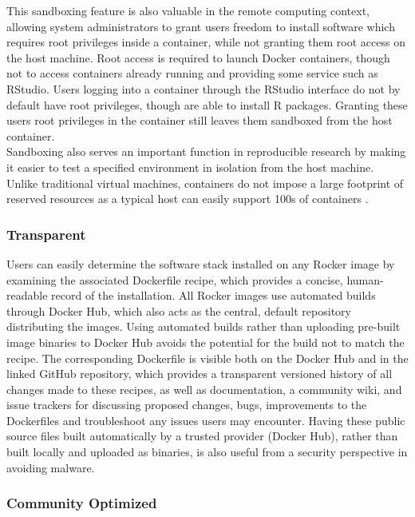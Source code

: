 This sandboxing feature is also valuable in the remote computing
context, allowing system administrators to grant users freedom to
install software which requires root privileges inside a container,
while not granting them root access on the host machine. Root access is
required to launch Docker containers, though not to access containers
already running and providing some service such as RStudio. Users
logging into a container through the
RStudio\textsuperscript{\textregistered} interface do not by default
have root privileges, though are able to install R packages. Granting
these users root privileges in the container still leaves them sandboxed
from the host container.\\
Sandboxing also serves an important function in reproducible research by
making it easier to test a specified environment in isolation from the
host machine. Unlike traditional virtual machines, containers do not
impose a large footprint of reserved resources as a typical host can
easily support 100s of containers \citep{what-docker}.

\subsubsection{Transparent}\label{transparent}

Users can easily determine the software stack installed on any Rocker
image by examining the associated Dockerfile recipe, which provides a
concise, human-readable record of the installation. All Rocker images
use automated builds through Docker Hub, which also acts as the central,
default repository distributing the images. Using automated builds
rather than uploading pre-built image binaries to Docker Hub avoids the
potential for the build not to match the recipe. The corresponding
Dockerfile is visible both on the Docker Hub and in the linked GitHub
repository, which provides a transparent versioned history of all
changes made to these recipes, as well as documentation, a community
wiki, and issue trackers for discussing proposed changes, bugs,
improvements to the Dockerfiles and troubleshoot any issues users may
encounter. Having these public source files built automatically by a
trusted provider (Docker Hub), rather than built locally and uploaded as
binaries, is also useful from a security perspective in avoiding
malware.

\subsubsection{Community Optimized}\label{community-optimized}

